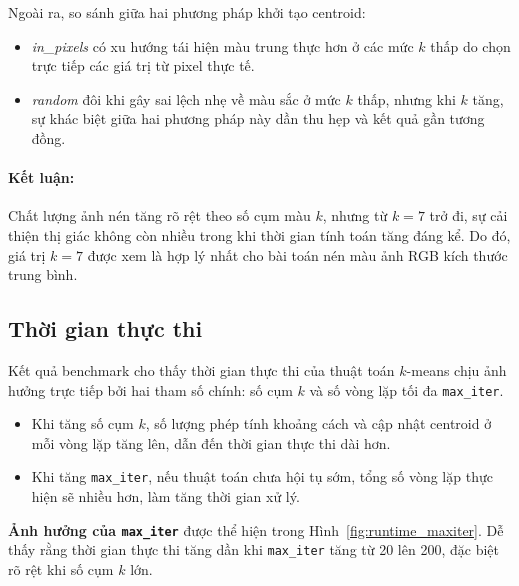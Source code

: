 Ngoài ra, so sánh giữa hai phương pháp khởi tạo centroid:
\begin{itemize}
  \item \textit{in\_pixels} có xu hướng tái hiện màu trung thực hơn ở các mức \(k\) thấp do chọn trực tiếp các giá trị từ pixel thực tế.
  \item \textit{random} đôi khi gây sai lệch nhẹ về màu sắc ở mức \(k\) thấp, nhưng khi \(k\) tăng, sự khác biệt giữa hai phương pháp này dần thu hẹp và kết quả gần tương đồng.
\end{itemize}

\paragraph{Kết luận:}
Chất lượng ảnh nén tăng rõ rệt theo số cụm màu \(k\), nhưng từ \(k=7\) trở đi, sự cải thiện thị giác không còn nhiều trong khi thời gian tính toán tăng đáng kể. Do đó, giá trị \(k=7\) được xem là hợp lý nhất cho bài toán nén màu ảnh RGB kích thước trung bình.

\newpage
\subsection{Thời gian thực thi}

Kết quả benchmark cho thấy thời gian thực thi của thuật toán \(k\)-means chịu ảnh hưởng trực tiếp bởi hai tham số chính: số cụm \(k\) và số vòng lặp tối đa \texttt{max\_iter}.

\begin{itemize}
  \item Khi tăng số cụm \(k\), số lượng phép tính khoảng cách và cập nhật centroid ở mỗi vòng lặp tăng lên, dẫn đến thời gian thực thi dài hơn.
  \item Khi tăng \texttt{max\_iter}, nếu thuật toán chưa hội tụ sớm, tổng số vòng lặp thực hiện sẽ nhiều hơn, làm tăng thời gian xử lý.
\end{itemize}

\textbf{Ảnh hưởng của \texttt{max\_iter}} được thể hiện trong Hình~\ref{fig:runtime_maxiter}. Dễ thấy rằng thời gian thực thi tăng dần khi \texttt{max\_iter} tăng từ 20 lên 200, đặc biệt rõ rệt khi số cụm \(k\) lớn.

